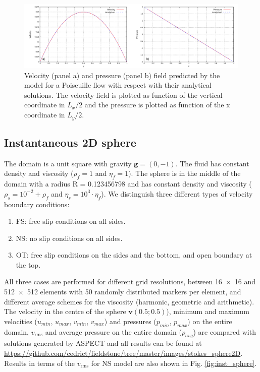 \documentclass[hidelinks,10pt,a4paper]{article}
\begin{document}
\begin{figure}
\noindent\includegraphics[width=\textwidth]{./Figures/Analytical.pdf}
\caption{Velocity (panel a) and pressure (panel b) field predicted by the model for a Poiseuille flow with respect with their analytical solutions. The
velocity field is plotted as function of the vertical coordinate in $L_x/2$ and the pressure is plotted as function of the x coordinate in $L_y/2$.}
\label{fig:poi_plot}
\end{figure}

\subsection{Instantaneous 2D sphere}\label{sec:ist_sphere}
The domain is a unit square with gravity $\bm{g}=(0,-1)$. The fluid has constant density and viscosity ($\rho_f=1$ and $\eta_f=1$). The sphere is in the middle
of the domain with a radius R = 0.123456798 and has constant density and viscosity ($\rho_s=10^{-2}+\rho_f$ and $\eta_s=10^3 \cdot \eta_f$).
We distinguish three different types of velocity boundary conditions:
\begin{enumerate}
\item FS: free slip conditions on all sides.
\item NS: no slip conditions on all sides.
\item OT: free slip conditions on the sides and the bottom, and open boundary at the top.
\end{enumerate}
All three cases are performed for different grid resolutions, between \num{16x16} and \num{512x512} elements with 50 randomly distributed markers per element,
and different average schemes for the viscosity (harmonic, geometric and arithmetic). The velocity in the centre of the sphere $\bm{v}(0.5;0.5)$), minimum and
maximum velocities ($u_{min}$, $u_{max}$, $v_{min}$, $v_{max}$) and pressures ($p_{min}$, $p_{max}$) on the entire domain, $v_{\textrm{rms}}$ and average pressure on the
entire domain ($p_{avg}$) are compared with solutions generated by ASPECT \citep{KHB12,heister_aspect_methods2,aspect-doi-v2.2.0,aspectmanual} and all results
can be found at \url{https://github.com/cedrict/fieldstone/tree/master/images/stokes_sphere2D}. Results in terms of the $v_{\textrm{rms}}$ for NS model are also shown
in Fig. \ref{fig:inst_sphere}.
\end{document}
